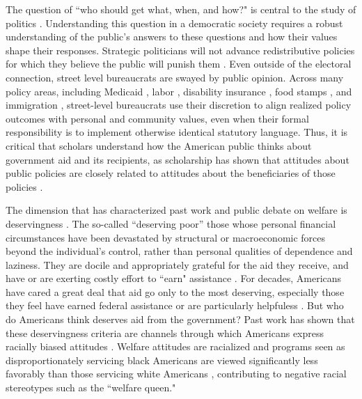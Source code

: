 \documentclass[12pt]{article}%
\begin{document}
\begin{doublespace}

The question of ``who should get what, when, and how?" is central to the study of politics \citep{lasswell2018politics}. Understanding this question in a democratic society requires a robust understanding of the public’s answers to these questions and how their values shape their responses. Strategic politicians will not advance redistributive policies for which they believe the public will punish them \citep{fearon1999electoral}. Even outside of the electoral connection, street level bureaucrats are swayed by public opinion. Across many policy areas, including Medicaid \citep{weissert1994beyond}, labor \citep{schmidt2002politicization}, disability insurance \citep{keiser1999state}, food stamps \citep{kogan_welfare_2021}, and immigration \citep{lewis2013some}, street-level bureaucrats use their discretion to align realized policy outcomes with personal and community values, even when their formal responsibility is to implement otherwise identical statutory language. Thus, it is critical that scholars understand how the American public thinks about government aid and its recipients, as scholarship has shown that attitudes about public policies are closely related to attitudes about the beneficiaries of those policies \citep{nelson1996issue, rabinowitz2009white, fossati2018wants}.

The dimension that has characterized past work and public debate on welfare is deservingness \citep{schneider_social_1993, ingram1993constructing, schneider2005deserving,  van2017social, gilens_why_2000, petersen2012social, petersen2012deserves, aaroe2014crowding}. The so-called ``deserving poor” those whose personal financial circumstances have been devastated by structural or macroeconomic forces beyond the individual’s control, rather than personal qualities of dependence and laziness. They are docile and appropriately grateful for the aid they receive, and have or are exerting costly effort to ``earn" assistance \citep{van_oorschot_who_nodate}. For decades, Americans have cared a great deal that aid go only to the most deserving, especially those they feel have earned federal assistance or are particularly helpfuless \citep{bobocel_justice-based_1998, katz_racial_1988, sniderman_symbolic_1986, sniderman_beyond_1996, mclosky_ethos}. But who do Americans think deserves aid from the government? Past work has shown that these deservingness criteria are channels through which Americans express racially biased attitudes \cite{gilens_why_2000}. Welfare attitudes are racialized \citep{desante_working_2013, gilliam_welfare_1999, gilens_why_2000} and programs seen as disproportionately servicing black Americans are viewed significantly less favorably than those servicing white Americans \citep{winter_beyond_2006}, contributing to negative racial stereotypes such as the ``welfare queen."


\end{doublespace}
\end{document}
